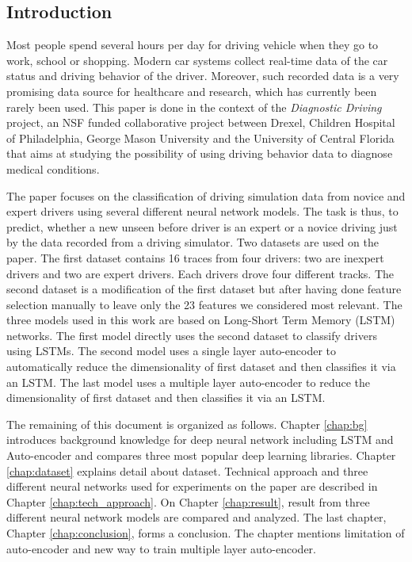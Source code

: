 \documentclass[draft,dvipsnames]{drexel-thesis}
\begin{document}
\begin{thesis}



\chapter{Introduction}\label{chap:intro}
Most people spend several hours per day for driving vehicle when they go to work, school or shopping. Modern car systems collect real-time data of the car status and driving behavior of the driver. Moreover, such recorded data is a very promising data source for healthcare and research, which has currently been rarely been used. This paper is done in the context of the {\em Diagnostic Driving} project, an NSF funded collaborative project between Drexel, Children Hospital of Philadelphia, George Mason University and the University of Central Florida that aims at studying the possibility of using driving behavior data to diagnose medical conditions.

The paper focuses on the classification of driving simulation data from novice and expert drivers using several different neural network models. The task is thus, to predict, whether a new unseen before driver is an expert or a novice driving just by the data recorded from a driving simulator. Two datasets are used on the paper. The first dataset contains 16 traces from four drivers: two are inexpert drivers and two are expert drivers. Each drivers drove four different tracks. The second dataset is a modification of the first dataset but after having done feature selection manually to leave only the 23 features we considered most relevant. The three models used in this work are based on Long-Short Term Memory (LSTM) networks. The first model directly uses the second dataset to classify drivers using LSTMs. The second model uses a single layer auto-encoder to automatically reduce the dimensionality of first dataset and then classifies it via an LSTM. The last model uses a multiple layer auto-encoder to reduce the dimensionality of first dataset and then classifies it via an LSTM. 

The remaining of this document is organized as follows. Chapter \ref{chap:bg} introduces background knowledge for deep neural network including LSTM and Auto-encoder and compares three most popular deep learning libraries. Chapter \ref{chap:dataset} explains detail about dataset. Technical approach and three different neural networks used for experiments on the paper are described in Chapter \ref{chap:tech_approach}. On Chapter \ref{chap:result}, result from three different neural network models are compared and analyzed. The last chapter, Chapter \ref{chap:conclusion}, forms a conclusion. The chapter mentions limitation of auto-encoder and new way to train multiple layer auto-encoder.



\end{thesis}
\end{document}
